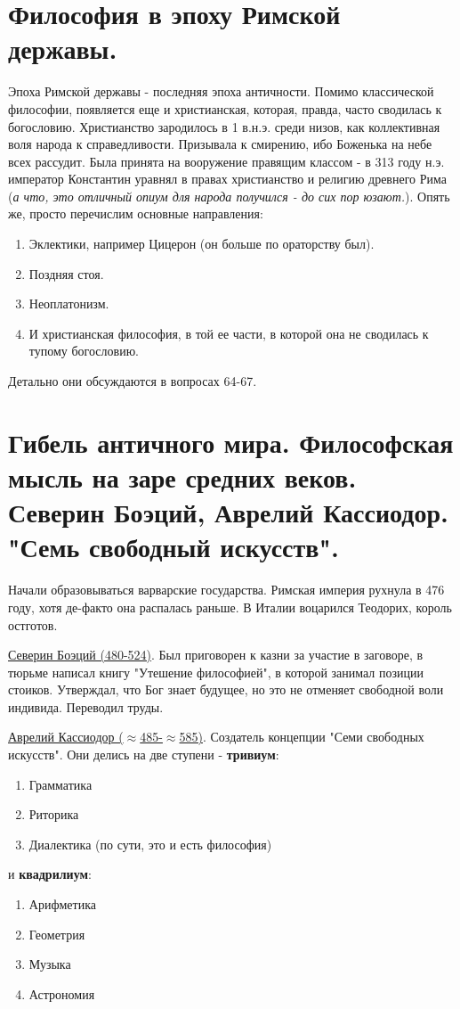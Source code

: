 \documentclass[12pt,a4paper]{article}
\begin{document}
\section{Философия в эпоху Римской державы.}
Эпоха Римской державы - последняя эпоха античности. Помимо классической философии, появляется еще и христианская, которая, правда, часто сводилась к богословию. Христианство зародилось в 1 в.н.э. среди низов, как коллективная воля народа к справедливости. Призывала к смирению, ибо Боженька на небе всех рассудит. Была принята на вооружение правящим классом - в 313 году н.э. император Константин уравнял в правах христианство и религию древнего Рима (\textit{а что, это отличный опиум для народа получился - до сих пор юзают.}). Опять же, просто перечислим основные направления:
\begin{enumerate}
\item Эклектики, например Цицерон (он больше по ораторству был).
\item Поздняя стоя. 
\item Неоплатонизм.
\item И христианская философия, в той ее части, в которой она не сводилась к тупому богословию.
\end{enumerate}
Детально они обсуждаются в вопросах 64-67.

\section{Гибель античного мира. Философская мысль на заре средних веков. Северин Боэций, Аврелий Кассиодор. "Семь свободный искусств". }
Начали образовываться варварские государства. Римская империя рухнула в 476 году, хотя де-факто она распалась раньше. В Италии воцарился Теодорих, король остготов. 

\underline{Северин Боэций (480-524)}. Был приговорен к казни за участие в заговоре, в тюрьме написал книгу "Утешение философией", в которой занимал позиции стоиков. Утверждал, что Бог знает будущее, но это не отменяет свободной воли индивида. Переводил труды.

\underline{Аврелий Кассиодор ($\approx$485-$\approx$585)}. Создатель концепции "Семи свободных искусств". Они делись на две ступени -  \textbf{тривиум}:
\begin{enumerate}
\item Грамматика
\item Риторика
\item Диалектика (по сути, это и есть философия)
\end{enumerate}
и \textbf{квадрилиум}:
\begin{enumerate}
\item Арифметика
\item Геометрия
\item Музыка
\item Астрономия
\end{enumerate}
\end{document}
